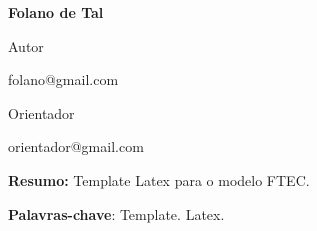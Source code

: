 \begin{Spacing}{1.0}

\begin{center}
    \ABNTEXchapterfont\bfseries\large\imprimirtitulo
\end{center}
\hfill

\hspace*{0pt}\hfill \bfseries\normalsize Folano de Tal

\hspace*{0pt}\hfill \normalfont Autor

\hspace*{0pt}\hfill \normalfont folano@gmail.com

\hfill

\hspace*{0pt}\hfill
{\bfseries\normalsize\imprimirorientador\par}

\hspace*{0pt}\hfill \normalfont\normalsize Orientador

\hspace*{0pt}\hfill \normalfont orientador@gmail.com

\hfill

\hfill

\begin{resumo}
    
\textbf{Resumo:}
Template Latex para o modelo FTEC.

\hfill

\textbf{Palavras-chave}:
Template. Latex.
\end{resumo}
\end{Spacing}\PRIVATEclearpageifneeded

